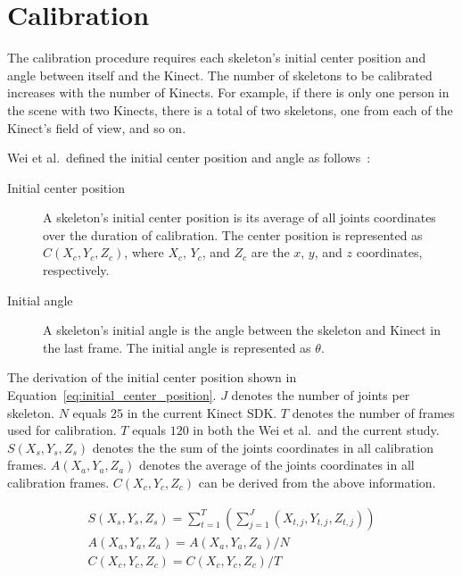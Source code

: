 \section{Calibration}
\label{sec:current_approach_calibration}

The calibration procedure requires each skeleton's initial center position and angle between itself and the Kinect. The number of skeletons to be calibrated increases with the number of Kinects. For example, if there is only one person in the scene with two Kinects, there is a total of two skeletons, one from each of the Kinect's field of view, and so on.

Wei et al.\ defined the initial center position and angle as follows~\cite{wei_kinect_calibration}:

\begin{description}
  \item[Initial center position] A skeleton's initial center position is its average of all joints coordinates over the duration of calibration. The center position is represented as $C(X_c, Y_c, Z_c)$, where $X_c$, $Y_c$, and $Z_c$ are the $x$, $y$, and $z$ coordinates, respectively.
  \item[Initial angle] A skeleton's initial angle is the angle between the skeleton and Kinect in the last frame. The initial angle is represented as $\theta$.
\end{description}

The derivation of the initial center position shown in Equation~\ref{eq:initial_center_position}. $J$ denotes the number of joints per skeleton. $N$ equals $25$ in the current Kinect SDK. $T$ denotes the number of frames used for calibration. $T$ equals $120$ in both the Wei et al.\ and the current study. $S(X_s, Y_s, Z_s)$ denotes the the sum of the joints coordinates in all calibration frames. $A(X_a, Y_a, Z_a)$ denotes the average of the joints coordinates in all calibration frames. $C(X_c, Y_c, Z_c)$ can be derived from the above information.

\begin{equation}
\label{eq:initial_center_position}
\begin{gathered}
S(X_s, Y_s, Z_s) = \sum_{t=1}^T (\sum_{j=1}^J (X_{t,j}, Y_{t,j}, Z_{t,j})) \\
A(X_a, Y_a, Z_a) = A(X_a, Y_a, Z_a) / N \\
C(X_c, Y_c, Z_c) = C(X_c, Y_c, Z_c) / T
\end{gathered}
\end{equation}

